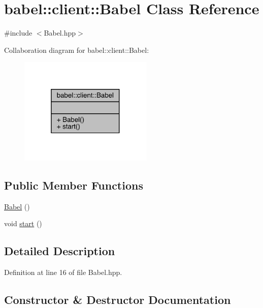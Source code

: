 \hypertarget{classbabel_1_1client_1_1_babel}{}\section{babel\+:\+:client\+:\+:Babel Class Reference}
\label{classbabel_1_1client_1_1_babel}


{\ttfamily \#include $<$Babel.\+hpp$>$}



Collaboration diagram for babel\+:\+:client\+:\+:Babel\+:\nopagebreak
\begin{figure}[H]
\begin{center}
\leavevmode
\includegraphics[width=181pt]{classbabel_1_1client_1_1_babel__coll__graph}
\end{center}
\end{figure}
\subsection*{Public Member Functions}
\begin{DoxyCompactItemize}
\item 
\mbox{\hyperlink{classbabel_1_1client_1_1_babel_a924cbbd77c70de3717ad896a153d9735}{Babel}} ()
\item 
void \mbox{\hyperlink{classbabel_1_1client_1_1_babel_aaa3a5814ad0b6a85aacce4dae8db95f8}{start}} ()
\end{DoxyCompactItemize}


\subsection{Detailed Description}


Definition at line 16 of file Babel.\+hpp.



\subsection{Constructor \& Destructor Documentation}
\mbox{\label{classbabel_1_1client_1_1_babel_a924cbbd77c70de3717ad896a153d9735}} 
